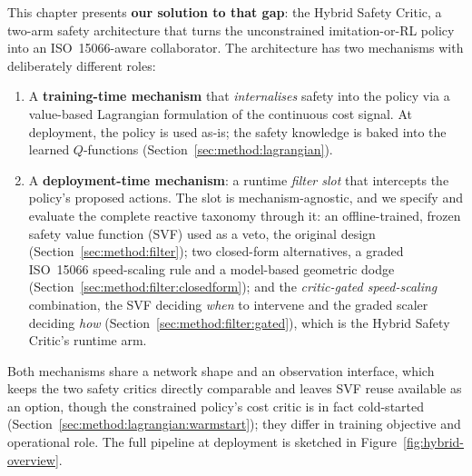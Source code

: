 \documentclass[11pt,a4paper]{report}
\newcommand{\iso}{ISO~15066}
\begin{document}
This chapter presents \textbf{our solution to that gap}: the Hybrid
Safety Critic, a two-arm safety architecture that turns the
unconstrained imitation-or-RL policy into an \iso{}-aware
collaborator. The architecture has two mechanisms with deliberately
different roles:

\begin{enumerate}[topsep=2pt,itemsep=2pt]
\item A \textbf{training-time mechanism} that \emph{internalises}
  safety into the policy via a value-based Lagrangian formulation
  of the continuous cost signal. At deployment, the policy is
  used as-is; the safety knowledge is baked into the learned
  $Q$-functions (Section~\ref{sec:method:lagrangian}).
\item A \textbf{deployment-time mechanism}: a runtime \emph{filter
  slot} that intercepts the policy's proposed actions. The slot is
  mechanism-agnostic, and we specify and evaluate the complete
  reactive taxonomy through it: an offline-trained, frozen safety
  value function (SVF) used as a veto, the original design
  (Section~\ref{sec:method:filter}); two closed-form
  alternatives, a graded \iso{} speed-scaling rule and a model-based
  geometric dodge (Section~\ref{sec:method:filter:closedform}); and
  the \emph{critic-gated speed-scaling} combination, the SVF deciding
  \emph{when} to intervene and the graded scaler deciding \emph{how}
  (Section~\ref{sec:method:filter:gated}), which is the Hybrid Safety
  Critic's runtime arm.
\end{enumerate}

Both mechanisms share a network shape and an observation interface,
which keeps the two safety critics directly comparable and leaves SVF
reuse available as an option, though the constrained policy's cost
critic is in fact cold-started
(Section~\ref{sec:method:lagrangian:warmstart}); they differ in
training objective and operational role. The full pipeline at
deployment is sketched in Figure~\ref{fig:hybrid-overview}.
\end{document}
